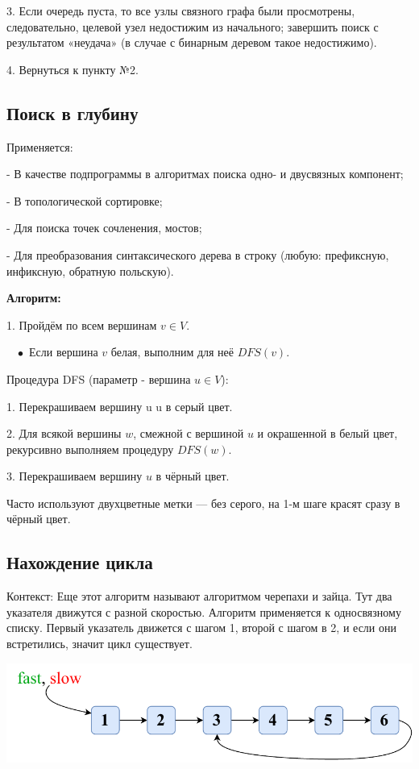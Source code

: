 \documentclass[utf8,14pt,a4paper,oneside,russian]{book}
\begin{document}
	3. Если очередь пуста, то все узлы связного графа были просмотрены, следовательно, целевой узел недостижим из начального; завершить поиск с результатом «неудача» (в случае с бинарным деревом такое недостижимо).
	
	4. Вернуться к пункту №2.
	
	\subsection{Поиск в глубину}
	
	Применяется:
	
	- В качестве подпрограммы в алгоритмах поиска одно- и двусвязных компонент;
	
	- В топологической сортировке;
	
	- Для поиска точек сочленения, мостов;
	
	- Для преобразования синтаксического дерева в строку (любую: префиксную, инфиксную, обратную польскую).
	
	\textbf{Алгоритм:}
	
	1. Пройдём по всем вершинам $v \in V$.
	
	$\; \; \; \bullet$ Если вершина $v$ белая, выполним для неё $DFS(v)$.
	
	Процедура DFS (параметр - вершина $u\in V$):
	
	1. Перекрашиваем вершину u u в серый цвет.
	
	2. Для всякой вершины $w$, смежной с вершиной $u$ и окрашенной в белый цвет, рекурсивно выполняем процедуру $DFS(w)$.
	
	3. Перекрашиваем вершину $u$ в чёрный цвет.
	
	Часто используют двухцветные метки — без серого, на 1-м шаге красят сразу в чёрный цвет.
	
	\subsection{Нахождение цикла}
	
	Контекст: Еще этот алгоритм называют алгоритмом черепахи и зайца. Тут два указателя движутся с разной скоростью. Алгоритм применяется к односвязному списку. Первый указатель движется с шагом 1, второй с шагом в 2, и если они встретились, значит цикл существует.
	
	\begin{center}
		\includegraphics[scale=0.8]{1}\\
	\end{center}
\end{document}
